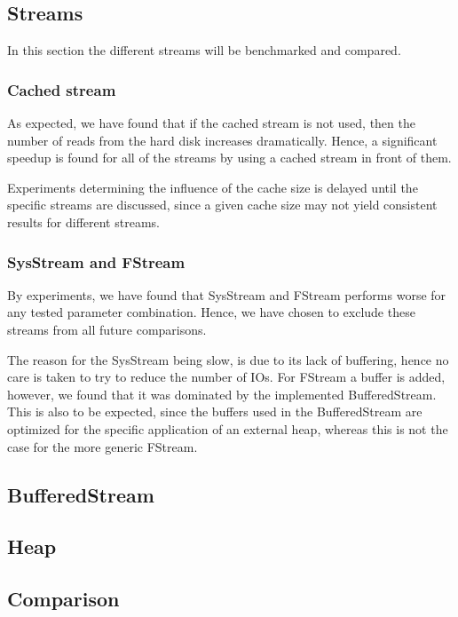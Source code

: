 \subsection{Streams}
In this section the different streams will be benchmarked and compared.

\subsubsection{Cached stream}
As expected, we have found that if the cached stream is not used, then the number of reads from the hard disk increases dramatically. Hence, a significant speedup is found for all of the streams by using a cached stream in front of them.

Experiments determining the influence of the cache size is delayed until the specific streams are discussed, since a given cache size may not yield consistent results for different streams.

\subsubsection{SysStream and FStream}
By experiments, we have found that SysStream and FStream performs worse for any tested parameter combination. Hence, we have chosen to exclude these streams from all future comparisons.

The reason for the SysStream being slow, is due to its lack of buffering, hence no care is taken to try to reduce the number of IOs. For FStream a buffer is added, however, we found that it was dominated by the implemented BufferedStream. This is also to be expected, since the buffers used in the BufferedStream are optimized for the specific application of an external heap, whereas this is not the case for the more generic FStream.

\subsection{BufferedStream}



\subsection{Heap}


\subsection{Comparison}